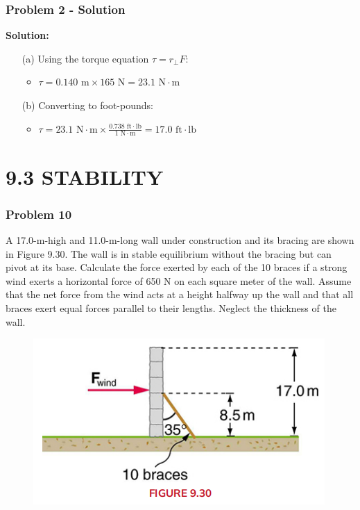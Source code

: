 \documentclass{beamer}
\begin{document}
\begin{frame}
\frametitle{Problem 2 - Solution}
\textbf{Solution:}
\begin{itemize}
    \item[(a)] Using the torque equation $\tau = r_\perp F$:
    \begin{itemize}
        \item $\tau = 0.140 \text{ m} \times 165 \text{ N} = 23.1 \text{ N} \cdot \text{m}$
    \end{itemize}
    \item[(b)] Converting to foot-pounds:
    \begin{itemize}
        \item $\tau = 23.1 \text{ N}\cdot\text{m} \times \frac{0.738 \text{ ft}\cdot\text{lb}}{1 \text{ N}\cdot\text{m}} = 17.0 \text{ ft}\cdot\text{lb}$
    \end{itemize}
\end{itemize}
\end{frame}

\section{9.3 STABILITY}

\begin{frame}
\frametitle{Problem 10}
A 17.0-m-high and 11.0-m-long wall under construction and its bracing are shown in Figure 9.30. The wall is in stable equilibrium without the bracing but can pivot at its base. Calculate the force exerted by each of the 10 braces if a strong wind exerts a horizontal force of 650 N on each square meter of the wall. Assume that the net force from the wind acts at a height halfway up the wall and that all braces exert equal forces parallel to their lengths. Neglect the thickness of the wall.
\begin{figure}[H]
    \centering
    \includegraphics[width=0.7\linewidth]{CH9/Screenshot 2024-11-04 122251.png}
\end{figure}

\end{frame}
\end{document}

